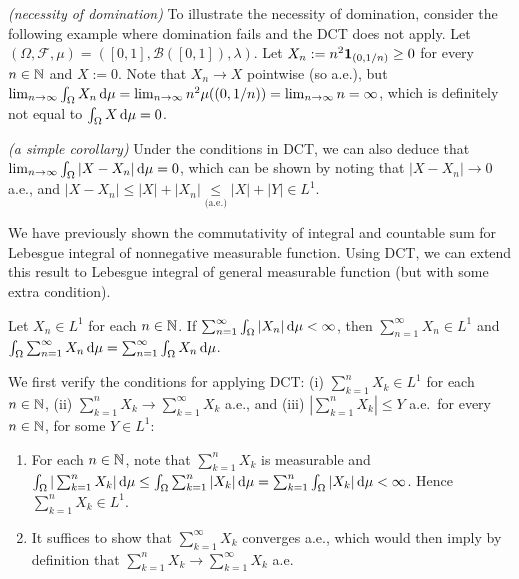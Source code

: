 \begin{enumerate}
\begin{remark}
\item \emph{(necessity of domination)} To illustrate the necessity of
domination, consider the following example where domination fails and the DCT
does not apply. Let \((\Omega,\mathcal{F},\mu)=([0,1],\mathcal{B}([0,1]),\lambda)\).
Let \(X_n:=n^{2}\mathbf{1}_{(0,1/n)}\ge 0\) for every \(n\in\mathbb{N}\) and \(X:=0\). Note
that \(X_n\to X\) pointwise (so a.e.), but \(\lim_{n\to\infty}\int_{\Omega}^{}X_n\odif{\mu}
=\lim_{n\to\infty}n^{2}\mu((0,1/n))=\lim_{n\to\infty}n=\infty\), which is
definitely not equal to \(\int_{\Omega}^{}X\odif{\mu}=0\).
\item \emph{(a simple corollary)} Under the conditions in DCT, we can also
deduce that \(\lim_{n\to\infty}\int_{\Omega}^{}|X-X_n|\odif{\mu}=0\), which can
be shown by noting that \(|X-X_n|\to 0\) a.e., and \(|X-X_n|\le
|X|+|X_n|\underset{\text{(a.e.)}}{\le}|X|+|Y|\in L^{1}\).
\end{remark}
We have previously shown the commutativity of integral and countable sum for
Lebesgue integral of nonnegative measurable function. Using DCT, we can extend
this result to Lebesgue integral of general measurable function (but with some
extra condition).
\begin{corollary}
\label{cor:leb-int-sum-commu}
Let \(X_n\in L^{1}\) for each \(n\in\mathbb{N}\). If
\(\sum_{n=1}^{\infty}\int_{\Omega}^{}|X_n|\odif{\mu}<\infty\), then
\(\sum_{n=1}^{\infty}X_n\in L^{1}\) and
\(\int_{\Omega}^{}\sum_{n=1}^{\infty}X_n\odif{\mu}=\sum_{n=1}^{\infty}\int_{\Omega}^{}X_n\odif{\mu}\).
\end{corollary}
\begin{pf}
We first verify the conditions for applying DCT: (i) \(\sum_{k=1}^{n}X_k\in L^{1}\) for each
\(n\in\mathbb{N}\), (ii) \(\sum_{k=1}^{n}X_k\to \sum_{k=1}^{\infty}X_k\) a.e., and
(iii) \(|\sum_{k=1}^{n}X_k|\le Y\) a.e.\ for every \(n\in\mathbb{N}\), for some \(Y\in L^{1}\):
\begin{enumerate}[label={(\roman*)}]
\item For each \(n\in\mathbb{N}\), note that \(\sum_{k=1}^{n}X_k\) is measurable and
\(\int_{\Omega}^{}|\sum_{k=1}^{n}X_k|\odif{\mu}
\le\int_{\Omega}^{}\sum_{k=1}^{n}|X_k|\odif{\mu}
=\sum_{k=1}^{n}\int_{\Omega}^{}|X_k|\odif{\mu}<\infty
\). Hence \(\sum_{k=1}^{n}X_k\in L^{1}\).
\item It suffices to show that \(\sum_{k=1}^{\infty}X_k\) converges a.e., which
would then imply by definition that \(\sum_{k=1}^{n}X_k\to \sum_{k=1}^{\infty}X_k\) a.e.


\end{enumerate}
\end{pf}
\end{enumerate}
